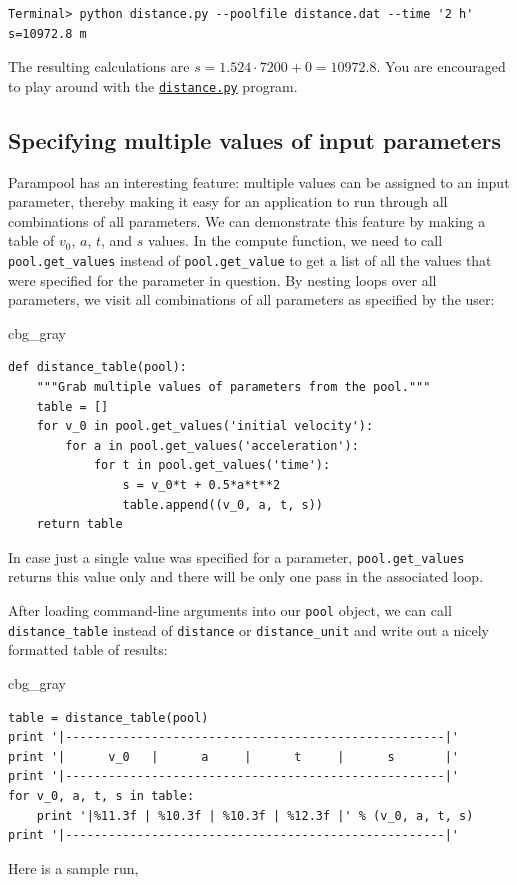 \documentclass[graybox,envcountchap,sectrefs,final]{svmonodo}
\newenvironment{_cod_tight}[1]{
   \def\FrameCommand{\colorbox{#1}}
   \FrameRule0.6pt\MakeFramed {\FrameRestore}\vskip3mm}
   {\vskip0mm\endMakeFramed}
\newenvironment{cod}[1]{
\bgroup\rmfamily
\fboxsep=0mm\relax
\begin{_cod_tight}{#1}
\list{}{\parsep=-2mm\parskip=0mm\topsep=0pt\leftmargin=2mm
\rightmargin=2\leftmargin\leftmargin=4pt\relax}
\item\relax}
{\endlist\end{_cod_tight}\egroup}
\begin{document}
\begin{Verbatim}[frame=lines,label=\fbox{{\tiny Terminal}},framesep=2.5mm,framerule=0.7pt,fontsize=\fontsize{9pt}{9pt}]
Terminal> python distance.py --poolfile distance.dat --time '2 h'
s=10972.8 m
\end{Verbatim}
The resulting calculations are $s=1.524\cdot 7200 + 0 =10972.8$.
You are encouraged to play around with the \href{{http://tinyurl.com/o8pb3yy/distance.py}}{\nolinkurl{distance.py}} program.


\subsection{Specifying multiple values of input parameters}

Parampool has an interesting feature: multiple values can be assigned
to an input parameter, thereby making it easy for an application to
run through all combinations of all parameters.
We can demonstrate this feature by making a table of $v_0$, $a$, $t$, and
$s$ values. In the compute function, we need to call \Verb!pool.get_values!
instead of \Verb!pool.get_value! to get a list of all the values that
were specified for the parameter in question. By nesting loops over
all parameters, we visit all combinations of all parameters as
specified by the user:

\begin{cod}{cbg_gray}\begin{Verbatim}[numbers=none,fontsize=\fontsize{9pt}{9pt},baselinestretch=0.95,xleftmargin=2mm]
def distance_table(pool):
    """Grab multiple values of parameters from the pool."""
    table = []
    for v_0 in pool.get_values('initial velocity'):
        for a in pool.get_values('acceleration'):
            for t in pool.get_values('time'):
                s = v_0*t + 0.5*a*t**2
                table.append((v_0, a, t, s))
    return table
\end{Verbatim}
\end{cod}
\noindent
In case just a single value was specified for a parameter, \Verb!pool.get_values!
returns this value only and there will be only one pass in the associated
loop.

After loading command-line arguments into our \texttt{pool} object, we can call
\Verb!distance_table! instead of \texttt{distance} or \Verb!distance_unit! and
write out a nicely formatted table of results:

\begin{cod}{cbg_gray}\begin{Verbatim}[numbers=none,fontsize=\fontsize{9pt}{9pt},baselinestretch=0.95,xleftmargin=2mm]
table = distance_table(pool)
print '|-----------------------------------------------------|'
print '|      v_0   |      a     |      t     |      s       |'
print '|-----------------------------------------------------|'
for v_0, a, t, s in table:
    print '|%11.3f | %10.3f | %10.3f | %12.3f |' % (v_0, a, t, s)
print '|-----------------------------------------------------|'
\end{Verbatim}
\end{cod}
\noindent
Here is a sample run,
\end{document}
